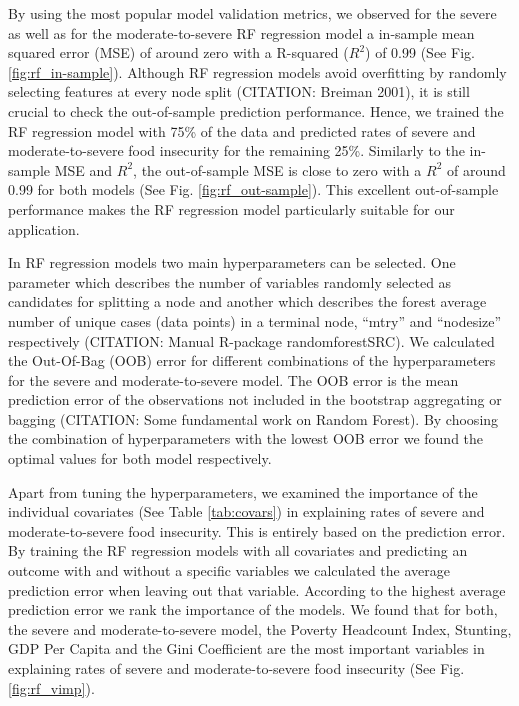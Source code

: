 \documentclass{article}
\begin{document}
By using the most popular model validation metrics, we observed for the severe as well as for the moderate-to-severe RF regression model a in-sample mean squared error (MSE) of around zero with a R-squared (${R}^2$) of 0.99 (See Fig. \ref{fig:rf_in-sample}). Although RF regression models avoid overfitting by randomly selecting features at every node split (CITATION: Breiman 2001), it is still crucial to check the out-of-sample prediction performance. Hence, we trained the RF regression model with 75\% of the data and predicted rates of severe and moderate-to-severe food insecurity for the remaining 25\%. Similarly to the in-sample MSE and ${R}^2$, the out-of-sample MSE is close to zero with a ${R}^2$ of around 0.99 for both models (See Fig. \ref{fig:rf_out-sample}). This excellent out-of-sample performance makes the RF regression model particularly suitable for our application. 

In RF regression models two main hyperparameters can be selected. One parameter which describes the number of variables randomly selected as candidates for splitting a node and another which describes the forest average number of unique cases (data points) in a terminal node, “mtry” and “nodesize” respectively (CITATION: Manual R-package randomforestSRC). We calculated the Out-Of-Bag (OOB) error for different combinations of the hyperparameters for the severe and moderate-to-severe model. The OOB error is the mean prediction error of the observations not included in the bootstrap aggregating or bagging (CITATION: Some fundamental work on Random Forest). By choosing the combination of hyperparameters with the lowest OOB error we found the optimal values for both model respectively.

Apart from tuning the hyperparameters, we examined the importance of the individual covariates (See Table \ref{tab:covars}) in explaining rates of severe and moderate-to-severe food insecurity. This is entirely based on the prediction error. By training the RF regression models with all covariates and predicting an outcome with and without a specific variables we calculated the average prediction error when leaving out that variable. According to the highest average prediction error we rank the importance of the models. We found that for both, the severe and moderate-to-severe model, the Poverty Headcount Index, Stunting, GDP Per Capita and the Gini Coefficient are the most important variables in explaining rates of severe and moderate-to-severe food insecurity (See Fig. \ref{fig:rf_vimp}). 
\end{document}
